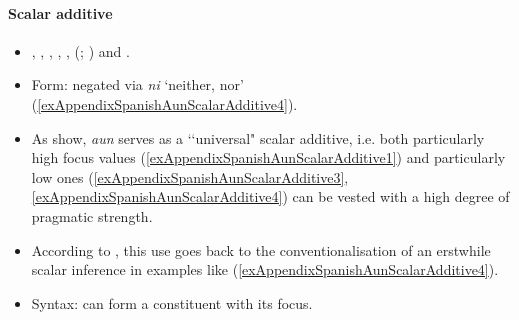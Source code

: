 \paragraph{Scalar additive}
\label{appendixSpanishAunScalarAdditive}
\begin{itemize}
	\item \textcite{Elvira2005}, \textcite[54–55]{FuentesRodriguez2018}, \textcite{Garrido1993}, \textcite{GastvanderAuwera2011}, \textcite{Cid1999}, \citeauthor{RAEGramatica} (\citeyear[§§30.8r, 40.8b]{RAEGramatica}; \citeyear[s.v. \textit{aun}]{RAEDictionary}) and \textcite{Trujillo1990}.
	\item Form: negated via \textit{ni} \lq neither, nor' (\ref{exAppendixSpanishAunScalarAdditive4}).
	\item As \textcite{GastvanderAuwera2011} show, \textit{aun} serves as a \lq\lq universal" scalar additive, i.e. both particularly high focus values (\ref{exAppendixSpanishAunScalarAdditive1}) and particularly low ones (\ref{exAppendixSpanishAunScalarAdditive3}, \ref{exAppendixSpanishAunScalarAdditive4}) can be vested with a high degree of pragmatic strength.
	\item According to \textcite{Trujillo1990}, this use goes back to the conventionalisation of an erstwhile scalar inference in examples like (\ref{exAppendixSpanishAunScalarAdditive4}). 
	\item Syntax: can form a constituent with its focus.
\end{itemize}

